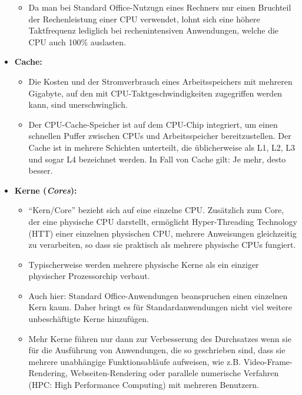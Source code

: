 \begin{itemize}
\begin{itemize}
	\item Da man bei Standard Office-Nutzugn eines Rechners nur einen Bruchteil der Rechenleistung einer CPU verwendet, lohnt sich eine höhere Taktfrequenz lediglich bei rechenintensiven Anwendungen, welche die CPU auch 100\% auslasten.
\end{itemize}
	\item \textbf{Cache:}
\begin{itemize}
	\item Die Kosten und der Stromverbrauch eines Arbeitsspeichers mit mehreren Gigabyte, auf den mit CPU-Taktgeschwindigkeiten zugegriffen werden kann, sind unerschwinglich. 
	\item Der CPU-Cache-Speicher ist auf dem CPU-Chip integriert, um einen schnellen Puffer zwischen CPUs und Arbeitsspeicher bereitzustellen. Der Cache ist in mehrere Schichten unterteilt, die üblicherweise als L1, L2, L3 und sogar L4 bezeichnet werden. In Fall von Cache gilt: Je mehr, desto besser.
\end{itemize}
	\item \textbf{Kerne (\textit{Cores}):}
\begin{itemize}
	\item 	``Kern/Core'' bezieht sich auf eine einzelne CPU. Zusätzlich zum Core, der eine physische CPU darstellt, ermöglicht Hyper-Threading Technology (HTT) einer einzelnen physischen CPU, mehrere Anweisungen gleichzeitig zu verarbeiten, so dass sie praktisch als mehrere physische CPUs fungiert.
	\item Typischerweise werden mehrere physische Kerne als ein einziger physischer Prozessorchip verbaut. 
	\item Auch hier: Standard Office-Anwendungen beanspruchen einen einzelnen Kern kaum. Daher bringt es für Standardanwendungen nicht viel weitere unbeschäftigte Kerne hinzufügen.
	\item Mehr Kerne führen nur dann zur Verbesserung des Durchsatzes wenn sie für die Ausführung von Anwendungen, die so geschrieben sind, dass sie mehrere unabhängige Funktionsabläufe aufweisen, wie z.B. Video-Frame-Rendering, Webseiten-Rendering oder parallele numerische Verfahren (HPC: High Performance Computing) mit mehreren Benutzern.
\end{itemize}
\end{itemize}








